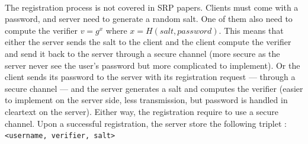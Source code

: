 ﻿\documentclass[../report.tex]{subfiles}
\begin{document}
\paragraph{}
The registration process is not covered in SRP papers.
Clients must come with a password, and server need to generate a random salt. One of them also need to compute the verifier $v = g^x$ where $x = H(salt, password)$.
This means that either the server sends the salt to the client and the client compute the verifier and send it back to the server through a secure channel (more secure as the server never see the user's password but more complicated to implement).
Or the client sends its password to the server with its registration request --- through a secure channel --- and the server generates a salt and computes the verifier (easier to implement on the server side, less transmission, but password is handled in cleartext on the server).
Either way, the registration require to use a secure channel.
Upon a successful registration, the server store the following triplet : \\
\verb|<username, verifier, salt>|
\end{document}
